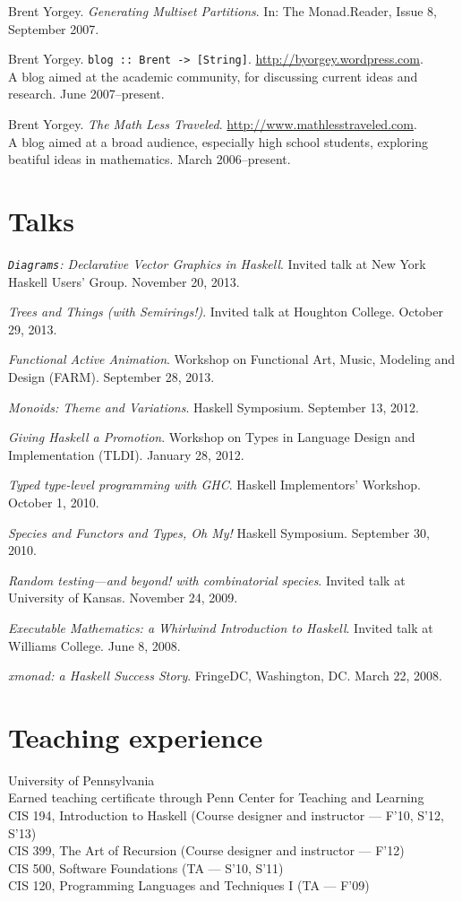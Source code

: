 \documentclass{article}
\newcommand{\cvitem}{\par\hangpara{2em}{1}}
\begin{document}
\cvitem Brent Yorgey. \emph{Generating Multiset Partitions}.  In: The
Monad.Reader, Issue 8, September 2007.

\cvitem Brent Yorgey. \texttt{blog :: Brent ->
  [String]}. \url{http://byorgey.wordpress.com}.  \\
A blog aimed at the academic community, for discussing current ideas
and research.  June 2007--present.

\cvitem Brent Yorgey. \emph{The Math Less
  Traveled}. \url{http://www.mathlesstraveled.com}. \\
A blog aimed at a broad audience, especially high school students,
exploring beatiful ideas in mathematics.  March 2006--present.

\section*{Talks}

\cvitem \emph{\texttt{Diagrams}: Declarative Vector Graphics in
    Haskell}. Invited talk at New York Haskell Users' Group. November
    20, 2013.
\cvitem \emph{Trees and Things (with Semirings!)}. Invited talk at Houghton
    College. October 29, 2013.
\cvitem \emph{Functional Active Animation}. Workshop on Functional
    Art, Music, Modeling and Design (FARM).  September 28, 2013.
\cvitem \emph{Monoids: Theme and Variations}. Haskell Symposium.
    September 13, 2012.
\cvitem \emph{Giving Haskell a Promotion}. Workshop on Types in
    Language Design and Implementation (TLDI). January 28, 2012.
\cvitem \emph{Typed type-level programming with GHC}. Haskell
    Implementors' Workshop. October 1, 2010.
\cvitem \emph{Species and Functors and Types, Oh My!} Haskell
    Symposium. September 30, 2010.
\cvitem \emph{Random testing---and beyond! with combinatorial
    species}. Invited talk at University of Kansas.  November 24, 2009.
\cvitem \emph{Executable Mathematics: a Whirlwind Introduction to
    Haskell}. Invited talk at Williams College.  June 8, 2008.
\cvitem \emph{xmonad: a Haskell Success Story}. FringeDC, Washington,
    DC. March 22, 2008.

\section*{Teaching experience}

\cvitem
University of Pennsylvania \\
Earned teaching certificate through Penn Center for Teaching and
Learning \\
CIS 194, Introduction to Haskell (Course designer and instructor ---
F'10, S'12, S'13) \\
CIS 399, The Art of Recursion (Course designer and instructor ---
F'12) \\
CIS 500, Software Foundations (TA --- S'10, S'11) \\
CIS 120, Programming Languages and Techniques I (TA --- F'09)
\end{document}
